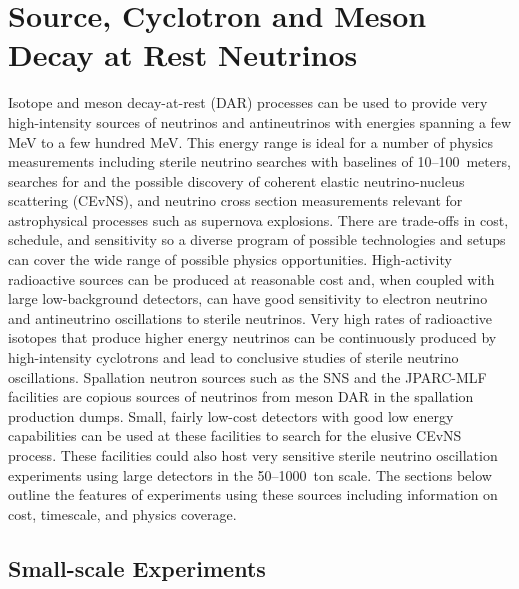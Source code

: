 \section{Source, Cyclotron and Meson Decay at Rest Neutrinos}

\label{sec:SourceCyclotronDAR}



Isotope and meson decay-at-rest (DAR) processes can be used to provide
very high-intensity sources of neutrinos and antineutrinos with
energies spanning a few MeV to a few hundred MeV. This energy range
is ideal for a number of physics measurements including sterile
neutrino searches with baselines of 10--100~meters, searches for and
the possible discovery of coherent elastic neutrino-nucleus
scattering (CEvNS), and neutrino cross section measurements relevant
for astrophysical processes such as supernova explosions. There are
trade-offs in cost, schedule, and sensitivity so a diverse program of
possible technologies and setups can cover the wide range of possible
physics opportunities. High-activity radioactive sources can be
produced at reasonable cost and, when coupled with large
low-background detectors, can have good sensitivity to electron
neutrino and antineutrino oscillations to sterile neutrinos. Very high
rates of radioactive isotopes that produce higher energy neutrinos can
be continuously produced by high-intensity cyclotrons and lead to
conclusive studies of sterile neutrino oscillations. Spallation
neutron sources such as the SNS and the JPARC-MLF facilities are
copious sources of neutrinos from meson DAR in the spallation
production dumps. Small, fairly low-cost detectors with good low
energy capabilities can be used at these facilities to search for
the elusive CEvNS process. These facilities could also host very
sensitive sterile neutrino oscillation experiments using large
detectors in the 50--1000~ton scale. The sections below outline the
features of experiments using these sources including
information on cost, timescale, and physics coverage.

\subsection{Small-scale Experiments}


